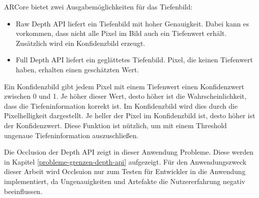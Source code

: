 ARCore bietet zwei Ausgabemöglichkeiten für das Tiefenbild:

\begin{itemize}
    \item Raw Depth API liefert ein Tiefenbild mit hoher Genauigkeit. Dabei kann es vorkommen, dass nicht alle Pixel im Bild auch ein Tiefenwert erhält. Zusätzlich wird ein Konfidenzbild erzeugt.
    \item Full Depth API liefert ein geglättetes Tiefenbild. Pixel, die keinen Tiefenwert haben, erhalten einen geschätzten Wert.
\end{itemize}

Ein Konfidenzbild gibt jedem Pixel mit einem Tiefenwert einen Konfidenzwert zwischen 0 und 1. Je höher dieser Wert, desto höher ist die Wahrscheinlichkeit, dass die Tiefeninformation korrekt ist. Im Konfidenzbild wird dies durch die Pixelhelligkeit dargestellt. Je heller der Pixel im Konfidenzbild ist, desto höher ist der Konfidenzwert. Diese Funktion ist nützlich, um mit einem Threshold ungenaue Tiefeninformation auszuschließen.

Die Occlusion der Depth API zeigt in dieser Anwendung Probleme. Diese werden in Kapitel \ref*{probleme-grenzen-depth-api} aufgezeigt. Für den Anwendungszweck dieser Arbeit wird Occlsuion nur zum Testen für Entwickler in die Anwendung implementiert, da Ungenauigkeiten und Artefakte die Nutzererfahrung negativ beeinflussen.
